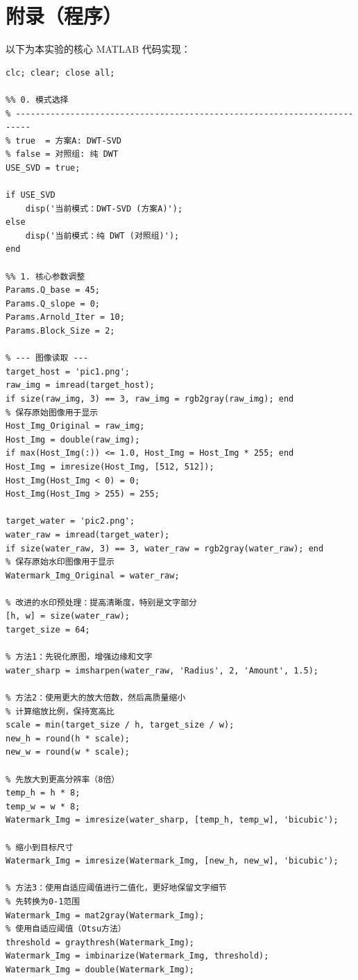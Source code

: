 \documentclass[zihao=-4, a4paper]{ctexart} %
\begin{document}
	\section*{附录（程序）}
	
	以下为本实验的核心 MATLAB 代码实现：
	
	\begin{lstlisting}[caption={DWT-SVD 水印嵌入与提取完整代码}]
clc; clear; close all;

%% 0. 模式选择 
% -------------------------------------------------------------------------
% true  = 方案A: DWT-SVD 
% false = 对照组: 纯 DWT 
USE_SVD = true; 

if USE_SVD
    disp('当前模式：DWT-SVD (方案A)');
else
    disp('当前模式：纯 DWT (对照组)');
end

%% 1. 核心参数调整 
Params.Q_base = 45;      
Params.Q_slope = 0;      
Params.Arnold_Iter = 10; 
Params.Block_Size = 2;   

% --- 图像读取 ---
target_host = 'pic1.png';
raw_img = imread(target_host);
if size(raw_img, 3) == 3, raw_img = rgb2gray(raw_img); end
% 保存原始图像用于显示
Host_Img_Original = raw_img;
Host_Img = double(raw_img);
if max(Host_Img(:)) <= 1.0, Host_Img = Host_Img * 255; end
Host_Img = imresize(Host_Img, [512, 512]);
Host_Img(Host_Img < 0) = 0;
Host_Img(Host_Img > 255) = 255;

target_water = 'pic2.png';
water_raw = imread(target_water);
if size(water_raw, 3) == 3, water_raw = rgb2gray(water_raw); end
% 保存原始水印图像用于显示
Watermark_Img_Original = water_raw;

% 改进的水印预处理：提高清晰度，特别是文字部分
[h, w] = size(water_raw);
target_size = 64;

% 方法1：先锐化原图，增强边缘和文字
water_sharp = imsharpen(water_raw, 'Radius', 2, 'Amount', 1.5);

% 方法2：使用更大的放大倍数，然后高质量缩小
% 计算缩放比例，保持宽高比
scale = min(target_size / h, target_size / w);
new_h = round(h * scale);
new_w = round(w * scale);

% 先放大到更高分辨率（8倍）
temp_h = h * 8;
temp_w = w * 8;
Watermark_Img = imresize(water_sharp, [temp_h, temp_w], 'bicubic');

% 缩小到目标尺寸
Watermark_Img = imresize(Watermark_Img, [new_h, new_w], 'bicubic');

% 方法3：使用自适应阈值进行二值化，更好地保留文字细节
% 先转换为0-1范围
Watermark_Img = mat2gray(Watermark_Img);
% 使用自适应阈值（Otsu方法）
threshold = graythresh(Watermark_Img);
Watermark_Img = imbinarize(Watermark_Img, threshold);
Watermark_Img = double(Watermark_Img);


\end{lstlisting}
\end{document}
